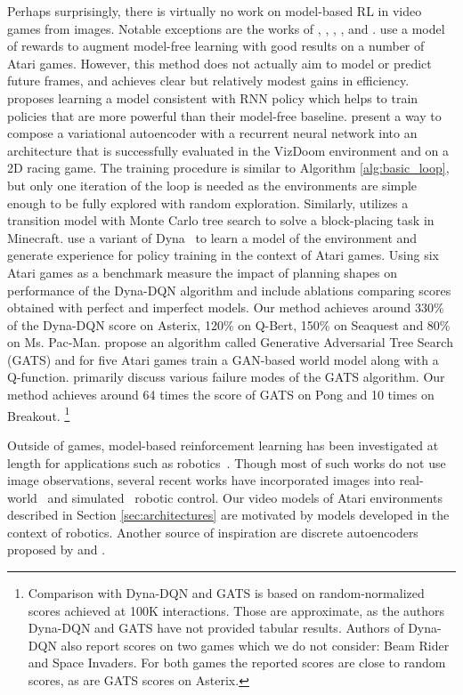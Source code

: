 Perhaps surprisingly, there is virtually no work on model-based RL in video games from images.
Notable exceptions are the works of
\citet{vpn}, \citet{sodhani2019learning}, \citet{world_models}, \citet{dyna_dqn}, \cite{leibfried2018model} and \citet{gats}. \citet{vpn} use a model of rewards to augment model-free learning with good results on a number of Atari games. However, this method does not actually aim to model or predict future frames, and achieves clear but relatively modest gains in efficiency.
\citet{sodhani2019learning} proposes learning a model consistent with RNN policy which helps to train policies that are more powerful than their model-free baseline.
\citet{world_models} present a way to compose a variational autoencoder with a recurrent neural network into an architecture  
that is successfully evaluated in the VizDoom environment and on a 2D racing game. The training procedure is similar to  Algorithm \ref{alg:basic_loop}, but only one iteration of the loop is needed as the environments are simple enough to be fully explored with random exploration. Similarly, \citet{alaniz2018deep} utilizes a transition model with Monte Carlo tree search to solve a block-placing task in Minecraft. \citet{dyna_dqn} use a variant of Dyna~\citep{dyna} to learn a model of the environment and generate experience for policy training in the context of Atari games. Using six Atari games as a benchmark \citet{dyna_dqn} measure the impact of planning shapes on performance of the Dyna-DQN algorithm and include ablations comparing scores obtained with perfect and imperfect models. Our method achieves around 330\% of the Dyna-DQN score on Asterix, 120\% on Q-Bert, 150\% on Seaquest and 80\% on Ms. Pac-Man. \cite{gats} propose an algorithm called Generative Adversarial Tree Search (GATS) and for five Atari games train a GAN-based world model along with a Q-function. \cite{gats} primarily discuss various failure modes of the GATS algorithm. Our method achieves around 64 times the score of GATS on Pong and 10 times on Breakout. \footnote{Comparison with Dyna-DQN and GATS is based on  random-normalized scores achieved at 100K interactions. Those are approximate, as the authors Dyna-DQN and GATS have not provided tabular results. Authors of Dyna-DQN also report scores on two games which we do not consider: Beam Rider and Space Invaders. For both games the reported scores are close to random scores, as are GATS scores on Asterix.}

Outside of games, model-based reinforcement learning has been investigated at length for applications such as robotics~\citep{deisenroth}. Though most of such works do not use image observations, several recent works
have incorporated images into real-world~\citep{deep_spatial, finn2016, sv2p, ebert, piergiovanni, paxton, rybkin-pertsch, ebert2018visual} and simulated~\citep{embed_to_control, hafner} robotic control. 
%
Our video models of Atari environments described in Section \ref{sec:architectures} are motivated by models developed in the context of robotics. Another source of inspiration are discrete autoencoders proposed by \citet{neural_discrete} and \citet{auto_discrete}.

